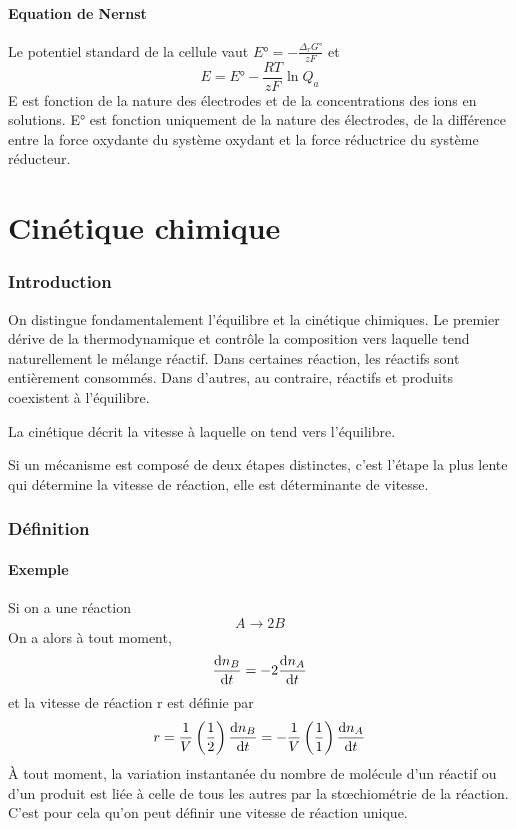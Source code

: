\subsection{Equation de Nernst}
Le potentiel standard de la cellule vaut $E° = -\frac{\Delta_rG°}{zF}$ et
\[ E = E°-\frac{RT}{zF}\ln Q_a \]
E est fonction de la nature des électrodes et
de la concentrations des ions en solutions.
E° est fonction uniquement de la nature des électrodes,
de la différence entre la force oxydante du système oxydant et
la force réductrice du système réducteur.

\part{Cinétique chimique}
\section{Introduction}
On distingue fondamentalement l'équilibre et la cinétique chimiques.
Le premier dérive de la thermodynamique et contrôle la composition vers
laquelle tend naturellement le mélange réactif.
Dans certaines réaction, les réactifs sont entièrement consommés.
Dans d'autres, au contraire, réactifs et produits coexistent à l'équilibre.

La cinétique décrit la vitesse à laquelle on tend vers l'équilibre.

Si un mécanisme est composé de deux étapes distinctes,
c'est l'étape la plus lente qui détermine la vitesse de réaction,
elle est déterminante de vitesse.
\section{Définition}
\subsection{Exemple}
Si on a une réaction
\[ A \longrightarrow 2B \]
On  a alors à tout moment,
\[ \frac{\operatorname{d}\! n_B}{\operatorname{d}\! t} = -2\frac{\operatorname{d}\! n_A}{\operatorname{d}\! t} \]
et la vitesse de réaction r est définie par
\[ r = \frac 1V \left(\frac 12 \right)\frac{\operatorname{d}\! n_B}{\operatorname{d}\! t} =
-\frac 1V \left(\frac 11 \right) \frac{\operatorname{d}\! n_A}{\operatorname{d}\! t} \]
À tout moment, la variation instantanée du nombre de molécule d'un
réactif ou d'un produit est liée à celle de tous les autres
par la stœchiométrie de la réaction.
C'est pour cela qu'on peut définir une vitesse de réaction unique.

